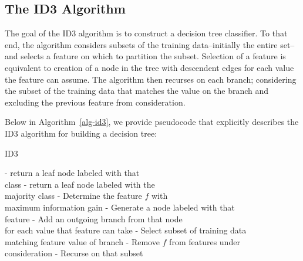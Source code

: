 \documentclass[12pt, conference, compsocconf]{IEEEtran}
\begin{document}
\subsection{The ID3 Algorithm}
The goal of the ID3 algorithm is to construct a decision tree classifier. 
To that end, the algorithm considers subsets of the training data--initially the entire set--and selects a feature on which to partition the subset. 
Selection of a feature is equivalent to creation of a node in the tree with descendent edges for each value the feature can assume.
The algorithm then recurses on each branch; considering the subset of the training data that matches the value on the branch and excluding the previous feature from consideration.

Below in Algorithm~\ref{alg-id3}, we provide pseudocode that explicitly describes the ID3 algorithm for building a decision tree:

\begin{algorithm}
    \caption{ID3}
    \label{alg-id3}
    \begin{algorithmic}[1]
            \State - return a leaf node labeled with that \\ \hspace{45pt}class
            \State - return a leaf node labeled with the \\ \hspace{45pt}majority class
            \Else
            \State - Determine the feature $f$ with \\ \hspace{45pt}maximum information gain
            \State - Generate a node labeled with that \\ \hspace{45pt}feature
            \State - Add an outgoing branch from that node \\ \hspace{45pt}for each value that feature can take
                \State - Select subset of training data \\ \hspace{62pt}matching feature value of branch
                \State - Remove $f$ from features under \\ \hspace{62pt}consideration
                    \State - Recurse on that subset   
                \EndFor
            \EndIf
        \EndFunction
    \end{algorithmic}
\end{algorithm}
\end{document}
